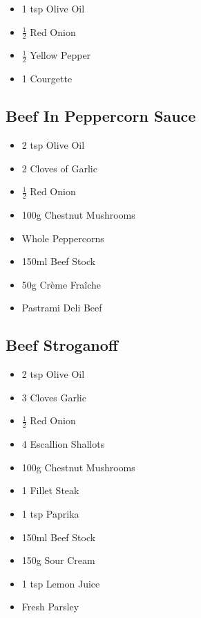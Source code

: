 \documentclass[11pt, english]{article}
\begin{document}
	\begin{itemize}
        \setlength\itemsep{0cm}
		\item 1 tsp Olive Oil
		\item $\frac{1}{2}$ Red Onion
		\item $\frac{1}{2}$ Yellow Pepper
		\item 1 Courgette
        \end{itemize}

\newpage

	\subsection{Beef In Peppercorn Sauce}

	\begin{itemize}
        \setlength\itemsep{0cm}
		\item 2 tsp Olive Oil
		\item 2 Cloves of Garlic
		\item $\frac{1}{2}$ Red Onion
		\item 100g Chestnut Mushrooms
		\item Whole Peppercorns
		\item 150ml Beef Stock
		\item 50g Cr\`{e}me Fra\^{i}che 
		\item Pastrami Deli Beef
        \end{itemize}

\newpage

	\subsection{Beef Stroganoff}

	\begin{itemize}
	\setlength\itemsep{0cm}
		\item 2 tsp Olive Oil
		\item 3 Cloves Garlic
		\item $\frac{1}{2}$ Red Onion
		\item 4 Escallion Shallots
		\item 100g Chestnut Mushrooms
		\item 1 Fillet Steak
		\item 1 tsp Paprika
		\item 150ml Beef Stock
		\item 150g Sour Cream
		\item 1 tsp Lemon Juice
		\item Fresh Parsley
	\end{itemize}
\end{document}
